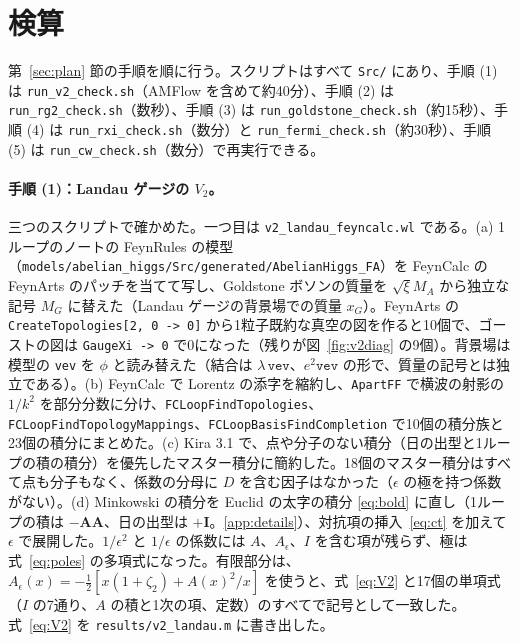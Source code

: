 \documentclass[a4paper,10pt]{ltjsarticle}
\newcommand{\Aeps}{A_\epsilon}
\begin{document}
\section{検算}\label{sec:checks}

第~\ref{sec:plan} 節の手順を順に行う。スクリプトはすべて \texttt{Src/} にあり、手順 (1) は \texttt{run\_v2\_check.sh}（AMFlow を含めて約40分）、手順 (2) は \texttt{run\_rg2\_check.sh}（数秒）、手順 (3) は \texttt{run\_goldstone\_check.sh}（約15秒）、手順 (4) は \texttt{run\_rxi\_check.sh}（数分）と \texttt{run\_fermi\_check.sh}（約30秒）、手順 (5) は \texttt{run\_cw\_check.sh}（数分）で再実行できる。

\paragraph{手順 (1)：Landau ゲージの $V_2$。}三つのスクリプトで確かめた。一つ目は \texttt{v2\_landau\_feyncalc.wl} である。(a) 1ループのノートの FeynRules の模型（\texttt{models/abelian\_higgs/Src/generated/AbelianHiggs\_FA}）を FeynCalc の FeynArts のパッチを当てて写し、Goldstone ボソンの質量を $\sqrt\xi M_A$ から独立な記号 $M_G$ に替えた（Landau ゲージの背景場での質量 $x_G$）。FeynArts の \texttt{CreateTopologies[2, 0 -> 0]} から1粒子既約な真空の図を作ると10個で、ゴーストの図は \texttt{GaugeXi -> 0} で0になった（残りが図~\ref{fig:v2diag} の9個）。背景場は模型の \texttt{vev} を $\phi$ と読み替えた（結合は $\lambda\,\texttt{vev}$、$e^2\texttt{vev}$ の形で、質量の記号とは独立である）。(b) FeynCalc で Lorentz の添字を縮約し、\texttt{ApartFF} で横波の射影の $1/k^2$ を部分分数に分け、\texttt{FCLoopFindTopologies}、\texttt{FCLoopFindTopologyMappings}、\texttt{FCLoopBasisFindCompletion} で10個の積分族と23個の積分にまとめた。(c) Kira 3.1 で、点や分子のない積分（日の出型と1ループの積の積分）を優先したマスター積分に簡約した。18個のマスター積分はすべて点も分子もなく、係数の分母に $D$ を含む因子はなかった（$\epsilon$ の極を持つ係数がない）。(d) Minkowski の積分を Euclid の太字の積分 \eqref{eq:bold} に直し（1ループの積は $-\mathbf A\mathbf A$、日の出型は $+\mathbf I$。\ref{app:details}）、対抗項の挿入~\eqref{eq:ct} を加えて $\epsilon$ で展開した。$1/\epsilon^2$ と $1/\epsilon$ の係数には $A$、$\Aeps$、$I$ を含む項が残らず、極は式~\eqref{eq:poles} の多項式になった。有限部分は、$\Aeps(x)=-\frac12[x(1+\zeta_2)+A(x)^2/x]$ を使うと、式~\eqref{eq:V2} と17個の単項式（$I$ の7通り、$A$ の積と1次の項、定数）のすべてで記号として一致した。式~\eqref{eq:V2} を \texttt{results/v2\_landau.m} に書き出した。
\end{document}
